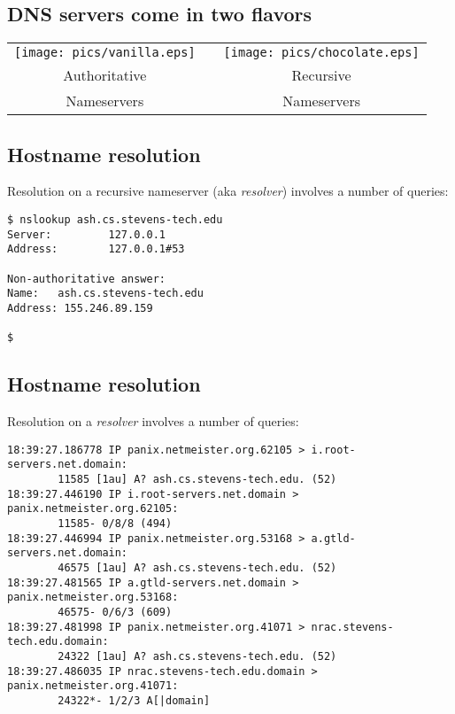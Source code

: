 \documentclass[xga]{xdvislides}
\begin{document}
\subsection{DNS servers come in two flavors}
\vspace*{\fill}
\begin{center}
	\begin{tabular}{ c c c }
	\texttt{[image: pics/vanilla.eps]} & \hspace{.5in} & \texttt{[image: pics/chocolate.eps]} \\
	\hspace{.3in} \Huge Authoritative & & \hspace{.3in} \Huge Recursive \\
	\hspace{.3in} \Huge Nameservers & & \hspace{.3in} \Huge Nameservers \\
	\end{tabular}
\end{center}
\vspace*{\fill}

\subsection{Hostname resolution}
Resolution on a recursive nameserver (aka {\em resolver}) involves a number of queries:
\vspace{.5in}
\begin{verbatim}
$ nslookup ash.cs.stevens-tech.edu
Server:         127.0.0.1
Address:        127.0.0.1#53

Non-authoritative answer:
Name:   ash.cs.stevens-tech.edu
Address: 155.246.89.159

$
\end{verbatim}

\subsection{Hostname resolution}
Resolution on a {\em resolver} involves a number of queries:
\begin{verbatim}
18:39:27.186778 IP panix.netmeister.org.62105 > i.root-servers.net.domain:
        11585 [1au] A? ash.cs.stevens-tech.edu. (52)
18:39:27.446190 IP i.root-servers.net.domain > panix.netmeister.org.62105:
        11585- 0/8/8 (494)
18:39:27.446994 IP panix.netmeister.org.53168 > a.gtld-servers.net.domain:
        46575 [1au] A? ash.cs.stevens-tech.edu. (52)
18:39:27.481565 IP a.gtld-servers.net.domain > panix.netmeister.org.53168:
        46575- 0/6/3 (609)
18:39:27.481998 IP panix.netmeister.org.41071 > nrac.stevens-tech.edu.domain:
        24322 [1au] A? ash.cs.stevens-tech.edu. (52)
18:39:27.486035 IP nrac.stevens-tech.edu.domain > panix.netmeister.org.41071:
        24322*- 1/2/3 A[|domain]
\end{verbatim}
\Normalsize
\end{document}
